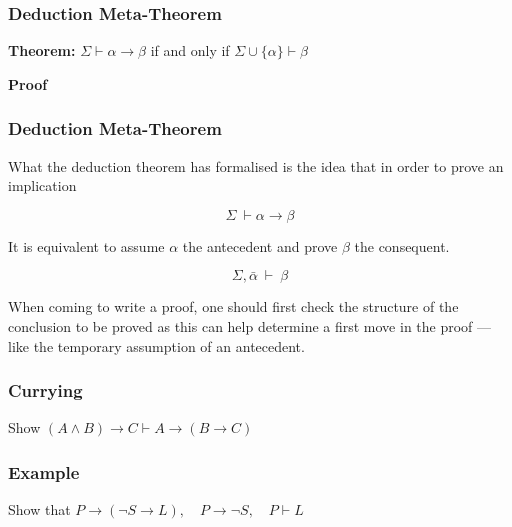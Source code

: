 \documentclass{beamer}
\begin{document}
\begin{frame}
	\frametitle{Deduction Meta-Theorem}	
	
	{\bf Theorem:} $\Sigma \vdash \alpha \rightarrow \beta$ if and only if $\Sigma \cup \{\alpha\} \vdash \beta$
	
	\vspace{5mm}
	
	{\bf Proof} 
	
	\vspace{50mm}
	
	
	
\end{frame}

\begin{frame}
	\frametitle{Deduction Meta-Theorem}

	What the deduction theorem has formalised is the idea that in order to prove an implication 

	$$\Sigma \ \vdash \alpha \to \beta$$

	It is equivalent to assume $\alpha$ the antecedent and prove $\beta$ the consequent. 

	$$\Sigma, \bar{\alpha} \ \vdash \ \beta$$

	When coming to write a proof, one should first check the structure of the conclusion to be proved as this can help determine a first move in the proof --- like the temporary assumption of an antecedent. 
\end{frame}


\begin{frame}
  \frametitle{Currying}

  Show $(A \land B) \to C \vdash A \to (B \to C)$
  
  \vspace{6cm}

\end{frame}

\begin{frame}
	\frametitle{Example}
	
	Show that $P \rightarrow (\lnot S\rightarrow L), \hspace{1em} P\rightarrow \lnot S, \hspace{1em} P \vdash L$

	\vspace{7cm}
	
\end{frame}
\end{document}
